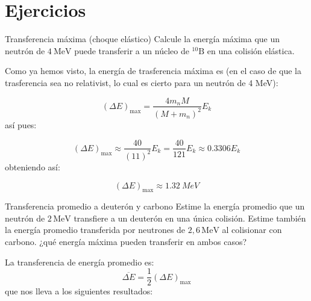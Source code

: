 \section*{Ejercicios}

\begin{Ejercicio}{Transferencia máxima (choque elástico)}\label{Ej:04-01}
Calcule la energía máxima que un neutrón de $4 \ \mathrm{MeV}$ puede transferir a un núcleo de $^{10}\mathrm{B}$ en una colisión elástica.
\end{Ejercicio}

Como ya hemos visto, la energía de trasferencia máxima es (en el caso de que la trasferencia sea no relativist, lo cual es cierto para un neutrón de 4 MeV): 

\begin{equation}
    (\Delta E)_{\max} = \frac{4m_n M}{(M+m_n)^2} E_{k}
\end{equation}
así pues: 

\begin{equation}
     (\Delta E)_{\max} \approx \frac{40}{(11)^2} E_k = \frac{40}{121} E_k \approx 0.3306 E_k
\end{equation}
obteniendo así: 

\begin{equation}
     (\Delta E)_{\max} \approx \SI{1.32}{MeV}
\end{equation}




\begin{Ejercicio}{Transferencia promedio a deuterón y carbono}\label{Ej:04-02}
Estime la energía promedio que un neutrón de $2\,\mathrm{MeV}$ transfiere a un deuterón en una única colisión. 
Estime también la energía promedio transferida por neutrones de $2{,}6\,\mathrm{MeV}$ al colisionar con carbono.
¿qué energía máxima pueden transferir en ambos casos?
\end{Ejercicio}

La transferencia de energía promedio es: 
\begin{equation}
    \overline{\Delta E} = \frac{1}{2} (\Delta E)_{\max}
\end{equation}
que nos lleva a los siguientes resultados:

